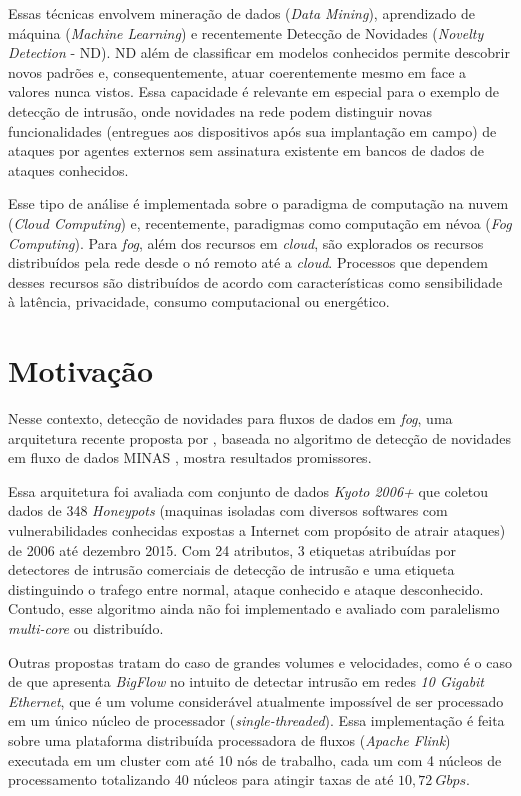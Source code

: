 Essas técnicas envolvem mineração de dados (\emph{Data Mining}), aprendizado de
máquina (\emph{Machine Learning}) e recentemente Detecção de Novidades
(\emph{Novelty Detection} - ND). ND além de classificar em modelos conhecidos
permite descobrir novos padrões e, consequentemente, atuar coerentemente mesmo
em face a valores nunca vistos. Essa capacidade é relevante em especial para o
exemplo de detecção de intrusão, onde novidades na rede podem distinguir novas
funcionalidades (entregues aos dispositivos após sua implantação em campo) de
ataques por agentes externos sem assinatura existente em bancos de
dados de ataques conhecidos.


Esse tipo de análise é implementada sobre o paradigma de computação na nuvem
(\emph{Cloud Computing}) e, recentemente, paradigmas como computação em névoa
(\emph{Fog Computing}). Para \emph{fog}, além dos recursos em \emph{cloud}, são
explorados os recursos distribuídos pela rede desde o nó remoto até a
\emph{cloud}. Processos que dependem desses recursos são distribuídos de acordo
com características como sensibilidade à latência, privacidade,
consumo computacional ou energético.

\section{Motivação}

Nesse contexto, detecção de novidades para fluxos de dados em \emph{fog}, uma
arquitetura recente proposta por , baseada no algoritmo
de detecção de novidades em fluxo de dados MINAS
\cite{Faria2016minas}, mostra resultados promissores.

Essa arquitetura foi avaliada com conjunto de dados \emph{Kyoto 2006+} que
coletou dados de 348 \emph{Honeypots} (maquinas isoladas com diversos softwares
com vulnerabilidades conhecidas expostas a Internet com propósito de atrair
ataques) de 2006 até dezembro 2015. Com 24 atributos, 3 etiquetas atribuídas por
detectores de intrusão comerciais de detecção de intrusão e uma etiqueta
distinguindo o trafego entre normal, ataque conhecido e ataque desconhecido.
Contudo, esse algoritmo ainda não foi implementado e avaliado com paralelismo
\emph{multi-core} ou distribuído.

Outras propostas tratam do caso de grandes volumes e velocidades, como é o caso
de  que apresenta \emph{BigFlow} no intuito de detectar
intrusão em redes \emph{10 Gigabit Ethernet}, que é um volume considerável
atualmente impossível de ser processado em um único núcleo de processador
(\emph{single-threaded}). Essa implementação é feita sobre uma plataforma
distribuída processadora de fluxos (\emph{Apache Flink}) executada em um cluster
com até 10 nós de trabalho, cada um com 4 núcleos de processamento totalizando
40 núcleos para atingir taxas de até $10,72 \ Gbps$.

